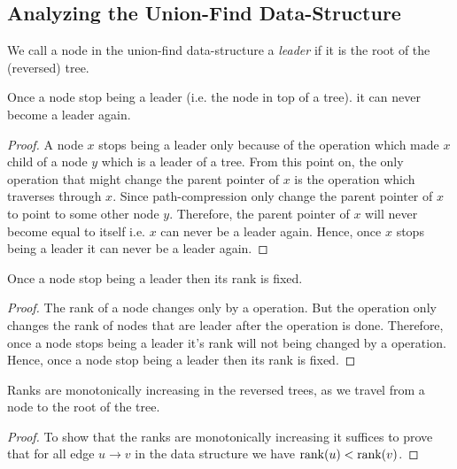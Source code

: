\subsection{Analyzing the Union-Find Data-Structure}
We call a node in the union-find data-structure a \emph{leader} if it is the root of the (reversed) tree.
\begin{lemma}{}{}
	Once a node stop being a {leader} (i.e. the node in top of a tree). it can never become a leader again.
\end{lemma}
\begin{proof}
	A node $x$ stops being a {leader} only because of the  operation which made $x$ child of a node $y$ which is a {leader} of a tree. From this point on, the only operation that might change the parent pointer of $x$ is the  operation which traverses through $x$. Since path-compression only change the parent pointer of $x$ to point to some other node $y$. Therefore, the parent pointer of $x$ will never become equal to itself i.e. $x$ can never be a {leader} again. Hence, once $x$ stops being a {leader} it can never be a {leader} again.
\end{proof}
\begin{lemma}{}{}
	Once a node stop being a leader then its rank is fixed.
\end{lemma}
\begin{proof}
	The rank of a node changes only by a  operation. But the  operation only changes the rank of nodes that are {leader} after the operation is done. Therefore, once a node stops being a {leader} it's rank will not being changed by a  operation. Hence, once a node stop being a leader then its rank is fixed.
\end{proof}
\begin{lemma}{}{}
	Ranks are monotonically increasing in the reversed trees, as we travel from a node to
	the root of the tree.
\end{lemma}
\begin{proof}
	To show that the ranks are monotonically increasing  it suffices to prove that for all edge $u\to v$ in the data structure we have $\operatorname{rank}(u)<\operatorname{rank}(v)$.
\end{proof}

